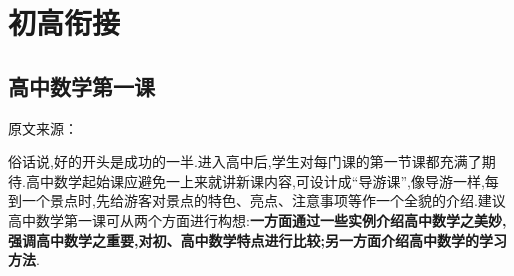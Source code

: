 \chapter{初高衔接}
\section{高中数学第一课}
\begin{center}
	原文来源：\citet{JiangGaoZhongShuXueDiYiKeDeJiaoXueGouXiang2016}
\end{center}

俗话说,好的开头是成功的一半.进入高中后,学生对每门课的第一节课都充满了期待.高中数学起始课应避免一上来就讲新课内容,可设计成“导游课”,像导游一样,每到一个景点时,先给游客对景点的特色、亮点、注意事项等作一个全貌的介绍.建议高中数学第一课可从两个方面进行构想:\textbf{一方面通过一些实例介绍高中数学之美妙,强调高中数学之重要,对初、高中数学特点进行比较;另一方面介绍高中数学的学习方法}.

